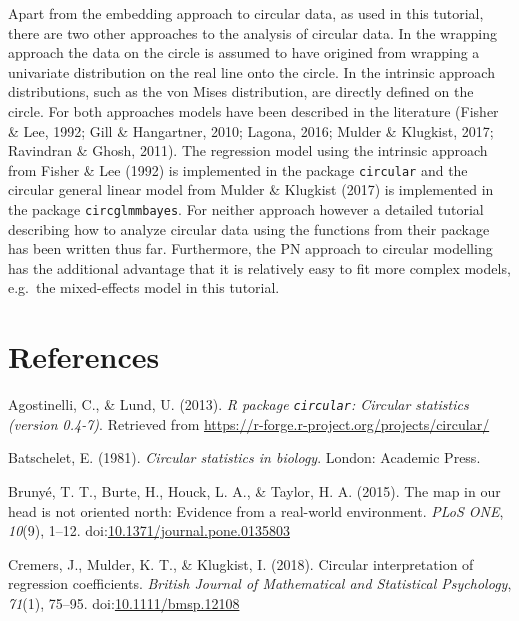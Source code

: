 \documentclass[11pt,]{article}
\begin{document}
Apart from the embedding approach to circular data, as used in this
tutorial, there are two other approaches to the analysis of circular
data. In the wrapping approach the data on the circle is assumed to have
origined from wrapping a univariate distribution on the real line onto
the circle. In the intrinsic approach distributions, such as the von
Mises distribution, are directly defined on the circle. For both
approaches models have been described in the literature (Fisher \& Lee,
1992; Gill \& Hangartner, 2010; Lagona, 2016; Mulder \& Klugkist, 2017;
Ravindran \& Ghosh, 2011). The regression model using the intrinsic
approach from Fisher \& Lee (1992) is implemented in the package
\verb|circular| and the circular general linear model from Mulder \&
Klugkist (2017) is implemented in the package \verb|circglmmbayes|. For
neither approach however a detailed tutorial describing how to analyze
circular data using the functions from their package has been written
thus far. Furthermore, the PN approach to circular modelling has the
additional advantage that it is relatively easy to fit more complex
models, e.g.~the mixed-effects model in this tutorial.

\newpage

\hypertarget{references}{%
\section*{References}\label{references}}

\hypertarget{refs}{}
\leavevmode\hypertarget{ref-circularpackage}{}%
Agostinelli, C., \& Lund, U. (2013). \emph{R package \texttt{circular}:
Circular statistics (version 0.4-7)}. Retrieved from
\url{https://r-forge.r-project.org/projects/circular/}

\leavevmode\hypertarget{ref-Batschelet1981}{}%
Batschelet, E. (1981). \emph{Circular statistics in biology}. London:
Academic Press.

\leavevmode\hypertarget{ref-brunye2015map}{}%
Brunyé, T. T., Burte, H., Houck, L. A., \& Taylor, H. A. (2015). The map
in our head is not oriented north: Evidence from a real-world
environment. \emph{PLoS ONE}, \emph{10}(9), 1--12.
doi:\href{https://doi.org/10.1371/journal.pone.0135803}{10.1371/journal.pone.0135803}

\leavevmode\hypertarget{ref-CremersMulderKlugkist2017}{}%
Cremers, J., Mulder, K. T., \& Klugkist, I. (2018). Circular
interpretation of regression coefficients. \emph{British Journal of
Mathematical and Statistical Psychology}, \emph{71}(1), 75--95.
doi:\href{https://doi.org/10.1111/bmsp.12108}{10.1111/bmsp.12108}
\end{document}

